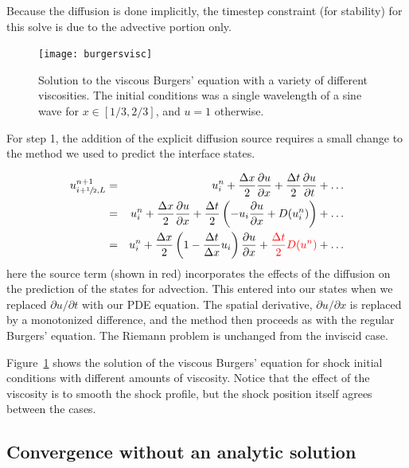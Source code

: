Because the diffusion is done implicitly, the timestep constraint (for
stability) for this solve is due to the advective portion only.

\begin{figure}[t]
\centering
\texttt{[image: burgersvisc]}
\caption[Viscous Burgers' equation solution]
  {\label{fig:viscburger} Solution to the viscous Burgers' equation
  with a variety of different viscosities.  The initial conditions was
  a single wavelength of a sine wave for $x \in [1/3,2/3]$, and $u = 1$
  otherwise. \\
  }
\end{figure}

For step 1, the addition of the explicit diffusion source requires
a small change to the method we used to predict the interface states.

\begin{eqnarray}
u^{n+1}_{i+{\sfrac{1}{2}},L} &=& u^n_i + \frac{\Delta x}{2} \frac{\partial u}{\partial x}
                        + \frac{\Delta t}{2} \frac{\partial u}{\partial t} + \ldots \\
                &=& u^n_i + \frac{\Delta x}{2} \frac{\partial u}{\partial x}
                        + \frac{\Delta t}{2} \left (-u_i \frac{\partial u}{\partial x} + D(u^n_i) \right ) + \ldots \\
                &=& u^n_i + \frac{\Delta x}{2} \left ( 1 - \frac{\Delta t}{\Delta x}u_i \right ) \frac{\partial u}{\partial x} + {\color{red} \frac{\Delta t}{2} D(u^n) } + \ldots
\end{eqnarray}
here the source term (shown in red) incorporates the effects of the
diffusion on the prediction of the states for advection.  This entered
into our states when we replaced $\partial u/\partial t$ with our PDE
equation.  The spatial derivative, $\partial u/\partial x$ is replaced
by a monotonized difference, and the method then proceeds as with the
regular Burgers' equation.  The Riemann problem is unchanged from the
inviscid case.

Figure~\ref{fig:viscburger} shows the solution of the viscous Burgers'
equation for shock initial conditions with different amounts of
viscosity.  Notice that the effect of the viscosity is to smooth the
shock profile, but the shock position itself agrees between the cases.


\subsection{Convergence without an analytic solution}

